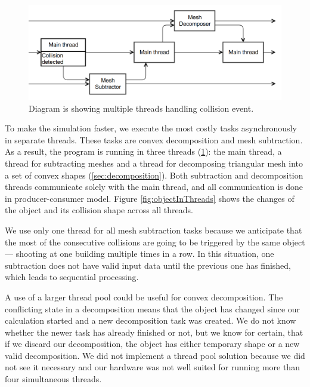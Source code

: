 \begin{figure}
        \centering
        \includegraphics[width=\textwidth]{img/decompositionFlow}
        \caption{Diagram is showing multiple threads handling collision event. }
        \label{fig:threads}
\end{figure}
To make the simulation faster, we execute the most costly tasks asynchronously in separate threads. These tasks are convex decomposition and mesh subtraction. As a result, the program is running in three threads (\cref{fig:threads}): the main thread, a thread for subtracting meshes and a thread for decomposing triangular mesh into a set of convex shapes (\cref{sec:decomposition}). Both subtraction and decomposition threads communicate solely with the main thread, and all communication is done in producer-consumer model. Figure \ref{fig:objectInThreads} shows the changes of the object and its collision shape across all threads.

We use only one thread for all mesh subtraction tasks because we anticipate that the most of the consecutive collisions are going to be triggered by the same object --- shooting at one building multiple times in a row. In this situation, one subtraction does not have valid input data until the previous one has finished, which leads to sequential processing.

A use of a larger thread pool could be useful for convex decomposition. The conflicting state in a decomposition means that the object has changed since our calculation started and a new decomposition task was created. We do not know whether the newer task has already finished or not, but we know for certain, that if we discard our decomposition, the object has either temporary shape or a new valid decomposition. We did not implement a thread pool solution because we did not see it necessary and our hardware was not well suited for running more than four simultaneous threads.

